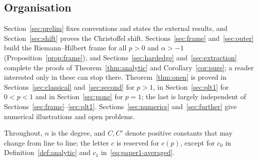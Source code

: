 \subsection{Organisation}\label{sec:organisation}
Section~\ref{sec:prelim} fixes conventions and states the external results, and Section~\ref{sec:shift} proves the
Christoffel shift. Sections~\ref{sec:frame} and~\ref{sec:outer} build the Riemann--Hilbert frame for all $p>0$ and
$\alpha>-1$ (Proposition~\ref{prop:frame}), and Sections~\ref{sec:hardedge} and~\ref{sec:extraction} complete the proofs
of Theorem~\ref{thm:analytic} and Corollary~\ref{cor:pure}; a reader interested only in these can stop there.
Theorem~\ref{thm:onen} is proved in Sections~\ref{sec:classical} and~\ref{sec:second} for $p>1$, in
Section~\ref{sec:plt1} for $0<p<1$ and in Section~\ref{sec:pone} for $p=1$; the last is largely independent of
Sections~\ref{sec:frame}--\ref{sec:plt1}. Sections~\ref{sec:numerics} and~\ref{sec:further} give numerical
illustrations and open problems.

Throughout, $n$ is the degree, and $C,C'$ denote positive constants that may change from line to line; the letter $c$
is reserved for $c(p)$, except for $c_0$ in Definition~\ref{def:analytic} and $c_1$ in~\eqref{eq:paper1-averaged}.
